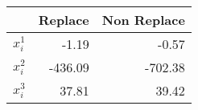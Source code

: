 \begin{tabular}{rrr}
  \hline
          & Replace & Non Replace \\
  \hline
  $x_i^1$ & -1.19   & -0.57       \\
  $x_i^2$ & -436.09 & -702.38     \\
  $x_i^3$ & 37.81   & 39.42       \\
  \hline
\end{tabular}
